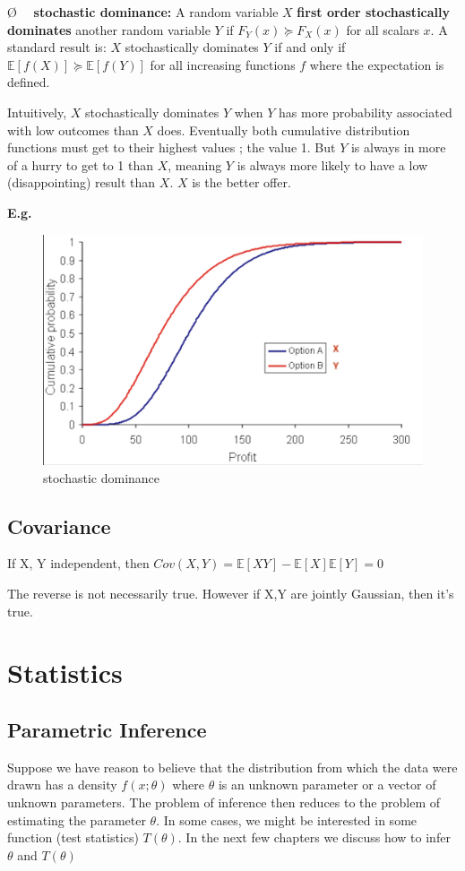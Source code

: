 \documentclass[13pt]{article}
\theoremstyle{definition}
\theoremstyle{remark}
\newenvironment{point}
  {\O~~}
  {}
\newcommand{\EE}{\mathbb{E}}
\begin{document}
  \begin{point}
    \textbf{stochastic dominance:} A random variable $X$ \textbf{first order stochastically dominates} another random variable $Y$ if $F_Y(x)\succeq F_X(x)$ for all scalars $x$.  A standard result is: $X$ stochastically dominates $Y$ if and only if $\mathbb{E}[f(X)]\succeq \mathbb{E}[f(Y)]$ for all increasing functions $f$ where the expectation is defined.

Intuitively, $X$ stochastically dominates $Y$ when $Y$ has more probability associated with low outcomes than $X$ does. Eventually both cumulative distribution functions must get to their highest values ; the value 1. But $Y$ is always in more of a hurry to get to 1 than $X$, meaning $Y$ is always more likely to have a low (disappointing) result than $X$. {\color{C3}$X$ is the better offer.}
    
    \textbf{E.g.} \begin{figure}[!htp]
        \centering
\includegraphics[width=0.4\linewidth,height =0.2\linewidth, angle=0]{stochastic_dominance.png}
        \caption{stochastic dominance}
        \label{fig:stochastic dominance}
    \end{figure} 
\end{point}

\subsection{Covariance}

If X, Y independent, then $Cov(X,Y)=\EE[XY]-\EE[X]\EE[Y]=0$

The reverse is not necessarily true. However if X,Y are jointly Gaussian, then it's true.

\section{Statistics}
\subsection{Parametric Inference}
Suppose we have reason to believe that the distribution from which the data were drawn has a density $f(x ; \theta)$ where $\theta$ is an unknown parameter or a vector of unknown parameters. The problem of inference then reduces to the problem of estimating the parameter $\theta$. In some cases, we might be interested in some function (test statistics) $T(\theta)$. In the next few chapters we discuss how to infer $\theta$ and $T(\theta)$
\end{document}

